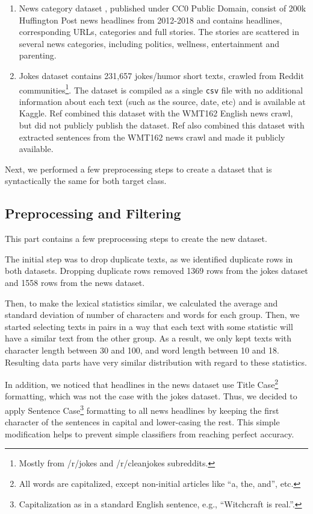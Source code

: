 \documentclass{article}
\begin{document}
\begin{enumerate}
    \item News category dataset \cite{dataset2018news}, published under CC0 Public Domain, consist of 200k Huffington Post news headlines from 2012-2018 and contains headlines, corresponding URLs, categories and full stories. The stories are scattered in several news categories, including politics, wellness, entertainment and parenting.

    \item Jokes dataset contains 231,657 jokes/humor short texts, crawled from Reddit communities\footnote{Mostly from /r/jokes and /r/cleanjokes subreddits.}. The dataset is compiled as a single \verb+csv+ file with no additional information about each text (such as the source, date, etc) and is available at Kaggle. Ref \cite{chen2018humor} combined this dataset with the WMT162 English news crawl, but did not publicly publish the dataset. Ref \cite{weller2019humor} also combined this dataset with extracted sentences from the WMT162 news crawl and made it publicly available.
\end{enumerate}

Next, we performed a few preprocessing steps to create a dataset that is syntactically the same for both target class.


\subsection{Preprocessing and Filtering}

This part contains a few preprocessing steps to create the new dataset.

The initial step was to drop duplicate texts, as we identified duplicate rows in both datasets. Dropping duplicate rows removed 1369 rows from the jokes dataset and 1558 rows from the news dataset.

Then, to make the lexical statistics similar, we calculated the average and standard deviation of number of characters and words for each group. Then, we started selecting texts in pairs in a way that each text with some statistic will have a similar text from the other group. As a result, we only kept texts with character length between 30 and 100, and word length between 10 and 18. Resulting data parts have very similar distribution with regard to these statistics.

In addition, we noticed that headlines in the news dataset use Title Case\footnote{All words are capitalized, except non-initial articles like “a, the, and”, etc.} formatting, which was not the case with the jokes dataset. Thus, we decided to apply Sentence Case\footnote{Capitalization as in a standard English sentence, e.g., “Witchcraft is real.”.} formatting to all news headlines by keeping the first character of the sentences in capital and lower-casing the rest. This simple modification helps to prevent simple classifiers from reaching perfect accuracy.
\end{document}
